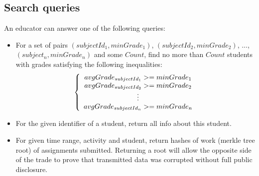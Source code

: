 \subsection{Search queries}

An educator can answer one of the following queries:
\begin{itemize}
\item For a set of pairs $(subjectId_1, minGrade_1)$, $(subjectId_2, minGrade_2)$, ..., $(subject_n, minGrade_n)$ and some $Count$, find no more than $Count$  students with grades satisfying the following inequalities:
\[
\left\{
\begin{array}{c}
avgGrade_{subjectId_1} >= minGrade_1 \\ avgGrade_{subjectId_2} >= minGrade_2 \\
\mathrel{\makebox[\widthof{=}]{\vdots}} \\ avgGrade_{subjectId_n} >= minGrade_n
\end{array}
\right.
\]

\item For the given identifier of a student, return all info about this student.
\item For given time range, activity and student, return hashes of work (merkle tree root) of assignments submitted. Returning a root will allow the opposite side of the trade to prove that transmitted data was corrupted without full public disclosure.
\end{itemize}
